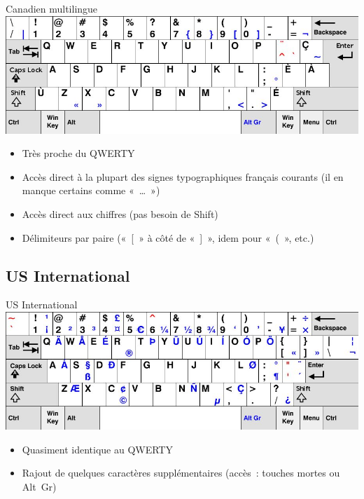 \begin{frame}{Canadien multilingue}
    \centering
    \includegraphics[width=\textwidth]{images/ca-multi.jpg}
    \pause

    \begin{itemize}
        \item Très proche du QWERTY \pause

        \item Accès direct à la plupart des signes typographiques français
          courants (il en manque certains comme «~…~») \pause

        \item Accès direct aux chiffres (pas besoin de Shift) \pause

        \item Délimiteurs par paire («~[~» à côté de «~]~», idem pour «~(~»,
          etc.)
    \end{itemize}
\end{frame}



\subsection{US International}

\begin{frame}{US International}
    \centering
    \includegraphics[width=\textwidth]{images/us-intl.jpg}
    \pause

    \begin{itemize}
	\item Quasiment identique au QWERTY \pause

        \item Rajout de quelques caractères supplémentaires (accès~: touches mortes ou Alt~Gr)
    \end{itemize}
\end{frame}



